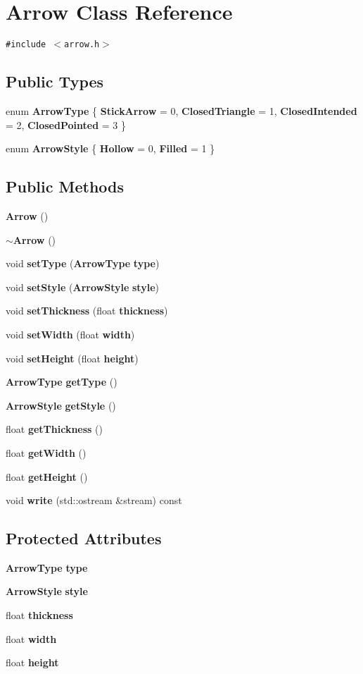 \section{Arrow Class Reference}
\label{classArrow}
{\tt \#include $<$arrow.h$>$}

\subsection*{Public Types}
\begin{CompactItemize}
\item 
enum {\bf Arrow\-Type} \{ {\bf Stick\-Arrow} =  0, 
{\bf Closed\-Triangle} =  1, 
{\bf Closed\-Intended} =  2, 
{\bf Closed\-Pointed} =  3
 \}
\item 
enum {\bf Arrow\-Style} \{ {\bf Hollow} =  0, 
{\bf Filled} =  1
 \}
\end{CompactItemize}
\subsection*{Public Methods}
\begin{CompactItemize}
\item 
{\bf Arrow} ()
\item 
{\bf $\sim$Arrow} ()
\item 
void {\bf set\-Type} ({\bf Arrow\-Type} {\bf type})
\item 
void {\bf set\-Style} ({\bf Arrow\-Style} {\bf style})
\item 
void {\bf set\-Thickness} (float {\bf thickness})
\item 
void {\bf set\-Width} (float {\bf width})
\item 
void {\bf set\-Height} (float {\bf height})
\item 
{\bf Arrow\-Type} {\bf get\-Type} ()
\item 
{\bf Arrow\-Style} {\bf get\-Style} ()
\item 
float {\bf get\-Thickness} ()
\item 
float {\bf get\-Width} ()
\item 
float {\bf get\-Height} ()
\item 
void {\bf write} (std::ostream \&stream) const
\end{CompactItemize}
\subsection*{Protected Attributes}
\begin{CompactItemize}
\item 
{\bf Arrow\-Type} {\bf type}
\item 
{\bf Arrow\-Style} {\bf style}
\item 
float {\bf thickness}
\item 
float {\bf width}
\item 
float {\bf height}
\end{CompactItemize}


